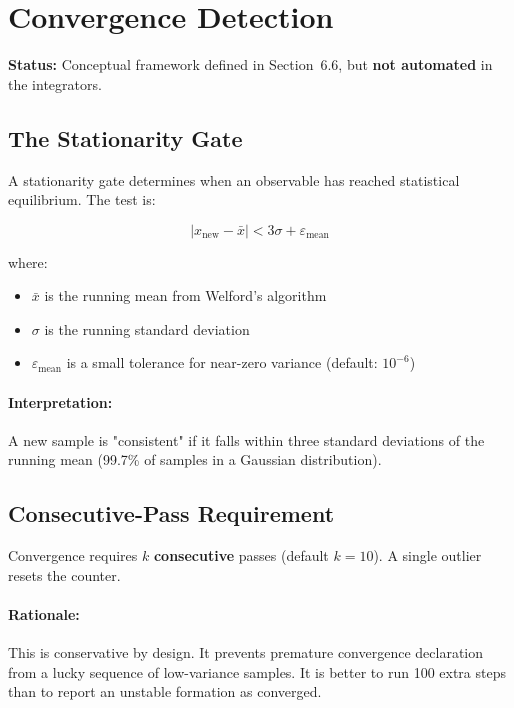 \documentclass[11pt]{article}
\begin{document}
\section{Convergence Detection}

\textbf{Status:} Conceptual framework defined in Section~6.6, but \textbf{not automated} in the integrators.

\subsection{The Stationarity Gate}

A stationarity gate determines when an observable has reached statistical equilibrium. The test is:

\begin{equation}
|x_{\text{new}} - \bar{x}| < 3\sigma + \varepsilon_{\text{mean}}
\end{equation}

where:
\begin{itemize}
\item $\bar{x}$ is the running mean from Welford's algorithm
\item $\sigma$ is the running standard deviation
\item $\varepsilon_{\text{mean}}$ is a small tolerance for near-zero variance (default: $10^{-6}$)
\end{itemize}

\paragraph{Interpretation:} A new sample is "consistent" if it falls within three standard deviations of the running mean (99.7\% of samples in a Gaussian distribution).

\subsection{Consecutive-Pass Requirement}

Convergence requires $k$ \textbf{consecutive} passes (default $k = 10$). A single outlier resets the counter.

\paragraph{Rationale:} This is conservative by design. It prevents premature convergence declaration from a lucky sequence of low-variance samples. It is better to run 100 extra steps than to report an unstable formation as converged.
\end{document}
